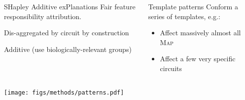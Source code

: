\documentclass[compress,ignorenonframetext,aspectratio=1610]{beamer}
\begin{document}
\begin{frame}
	
	\begin{columns}
		
		
		\begin{block}{SHapley Additive exPlanations}
				Fair feature responsibility attribution.
				
				Dis-aggregated by circuit by construction
				
				Additive (use biologically-relevant groups)
		\end{block}
	
		\begin{block}{Template patterns}
			Conform a series of templates, e.g.:
			
			\begin{itemize}
				\item Affect massively almost all \textsc{Map}
				\item Affect a few very specific circuits
			\end{itemize}
			
		\end{block}
	\end{columns}
	
	\pause
	
	\centering
	\texttt{[image: figs/methods/patterns.pdf]}
\end{frame}
\end{document}
